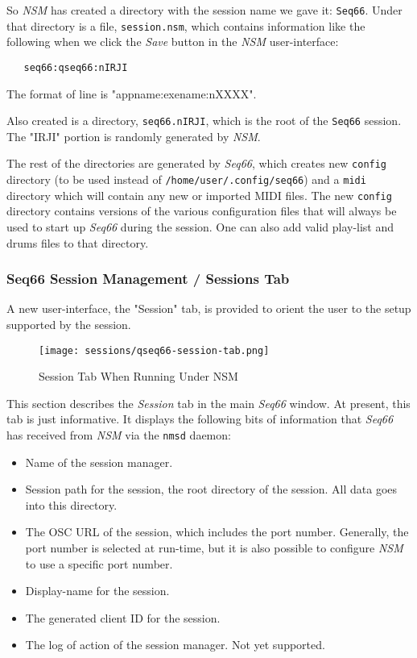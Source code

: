 	So \textsl{NSM} has created a directory with the session name we gave it:
   \texttt{Seq66}.  Under that directory is a file, \texttt{session.nsm}, which
   contains information like the following when we click the \textsl{Save}
   button in the \textsl{NSM} user-interface:

\begin{verbatim}
   seq66:qseq66:nIRJI
\end{verbatim}

   The format of line is "appname:exename:nXXXX".

   Also created is a directory, \texttt{seq66.nIRJI}, which is the root of the
   \texttt{Seq66} session.  The "IRJI" portion is randomly generated by
   \textsl{NSM}.

   The rest of the directories are generated by \textsl{Seq66}, which creates
   new \texttt{config} directory (to be used instead of
   \texttt{/home/user/.config/seq66}) and a \texttt{midi} directory which will
   contain any new or imported MIDI files.  The new \texttt{config} directory
   contains versions of the various configuration files that will always be
   used to start up \textsl{Seq66} during the session.  One can also add valid
   play-list and drums files to that directory.

\subsubsection{Seq66 Session Management / Sessions Tab}
\label{subsubsec:sessions_ui}

   A new user-interface, the "Session" tab, is provided to orient the user to
   the setup supported by the session.

\begin{figure}[H]
   \centering 
   \texttt{[image: sessions/qseq66-session-tab.png]}
   \caption*{Session Tab When Running Under NSM}
\end{figure}

   This section describes the \textsl{Session} tab in the main
   \textsl{Seq66} window.  At present, this tab is just informative.  It
   displays the following bits of information that \textsl{Seq66} has received
   from \textsl{NSM} via the \texttt{nmsd} daemon:

   \begin{itemize}
      \item Name of the session manager.
      \item Session path for the session, the root directory of the session.
         All data goes into this directory.
      \item The OSC URL of the session, which includes the port number.
         Generally, the port number is selected at run-time, but it is also
         possible to configure \textsl{NSM} to use a specific port number.
      \item Display-name for the session.
      \item The generated client ID for the session.
      \item The log of action of the session manager. Not yet supported.
   \end{itemize}

